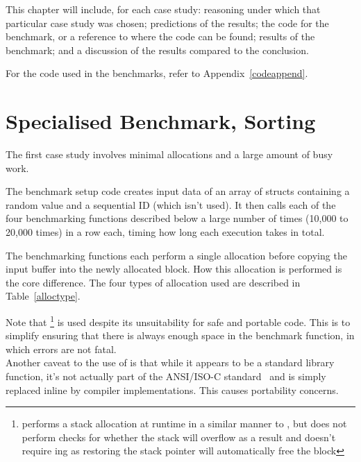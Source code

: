 This chapter will include, for each case study: reasoning under which that particular case study was chosen; predictions of the results; the code for the benchmark, or a reference to where the code can be found; results of the benchmark; and a discussion of the results compared to the conclusion.

For the code used in the benchmarks, refer to Appendix~\ref{codeappend}.

\section{Specialised Benchmark, Sorting}

The first case study involves minimal allocations and a large amount of busy work.

The benchmark setup code creates input data of an array of structs containing a random value and a sequential ID (which isn't used). It then calls each of the four benchmarking functions described below a large number of times (10,000 to 20,000 times) in a row each, timing how long each execution takes in total.

The benchmarking functions each perform a single allocation before copying the input buffer into the newly allocated block. How this allocation is performed is the core difference. The four types of allocation used are described in Table~\ref{alloctype}.

Note that \footnote{ performs a stack allocation at runtime in a similar manner to \malloc{}, but does not perform checks for whether the stack will overflow as a result and doesn't require \free{}ing as restoring the stack pointer will automatically free the block} is used despite its unsuitability for safe and portable code. This is to simplify ensuring that there is always enough space in the  benchmark function, in which errors are not fatal.\\
Another caveat to the use of  is that while it appears to be a standard library function, it's not actually part of the ANSI/ISO-C standard~\cite{c11std} and is simply replaced inline by compiler implementations. This causes portability concerns.

